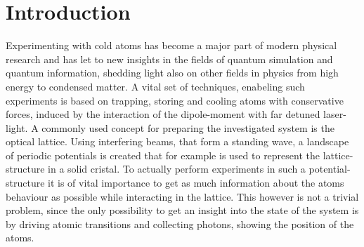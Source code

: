 \chapter{Introduction}

Experimenting with cold atoms has become a major part of modern physical research and has let to new insights in the fields of quantum simulation and quantum information, shedding light also on other fields in physics from high energy to condensed matter. A vital set of techniques, enabeling such experiments is based on trapping, storing and cooling atoms with conservative forces, induced by the interaction of the dipole-moment with far detuned laser-light. A commonly used concept for preparing the investigated system is the optical lattice. Using interfering beams, that form a standing wave, a landscape of periodic potentials is created that for example is used to represent the lattice-structure in a solid cristal. To actually perform experiments in such a potential-structure it is of vital importance to get as much information about the atoms behaviour as possible while interacting in the lattice. This however is not a trivial problem, since the only possibility to get an insight into the state of the system is by driving atomic transitions and collecting photons, showing the position of the atoms. 